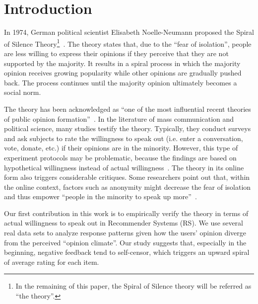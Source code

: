 \documentclass[sigconf]{acmart}
\begin{document}




\maketitle
\section{Introduction}\label{sec:introduction}

In 1974, German political scientist Elisabeth Noelle-Neumann proposed the Spiral of Silence Theory\footnote{In the remaining of this paper, the Spiral of Silence theory will be referred as ``the theory''.}~\cite{Neolle-Neumann1993spiral}. The theory states that, due to the ``fear of isolation'', people are less willing to express their opinions if they perceive that they are not supported by the majority. It results in a spiral process in which the majority opinion receives growing popularity while other opinions are gradually pushed back. The process continues until the majority opinion ultimately becomes a social norm.

The theory has been acknowledged as ``one of the most influential recent theories of public opinion formation''~\cite{Kennamer1990Self}. In the literature of mass communication and political science, many studies testify the theory. Typically, they conduct surveys and ask subjects to rate the willingness to speak out (i.e. enter a conversation, vote, donate, etc.) if their opinions are in the minority. However, this type of experiment protocols may be problematic, because the findings are based on hypothetical willingness instead of actual willingness~\cite{Carroll1997Perceived}. The theory in its online form also triggers considerable critiques. Some researchers point out that, within the online context, factors such as anonymity might decrease the fear of isolation and thus empower ``people in the minority to speak up more''~\cite{mcdevitt2003spiral}.

Our first contribution in this work is to empirically verify the theory in terms of actual willingness to speak out in Recommender Systems (RS). We use several real data sets to analyze response patterns given how the users' opinion diverge from the perceived ``opinion climate''. Our study suggests that, especially in the beginning, negative feedback tend to self-censor,  which triggers an upward spiral of average rating for each item.
\end{document}
